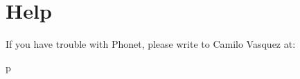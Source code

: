\documentclass[letterpaper,10pt,english]{sphinxmanual}
\begin{document}
\chapter{Help}
\label{\detokenize{index:help}}
If you have trouble with Phonet, please write to Camilo Vasquez at: 


\renewcommand{\indexname}{Python Module Index}
\begin{sphinxtheindex}
\def\bigletter#1{{\Large\sffamily#1}\nopagebreak\vspace{1mm}}
\bigletter{p}
\item {}
\end{sphinxtheindex}

\renewcommand{\indexname}{Index}
\printindex
\end{document}
